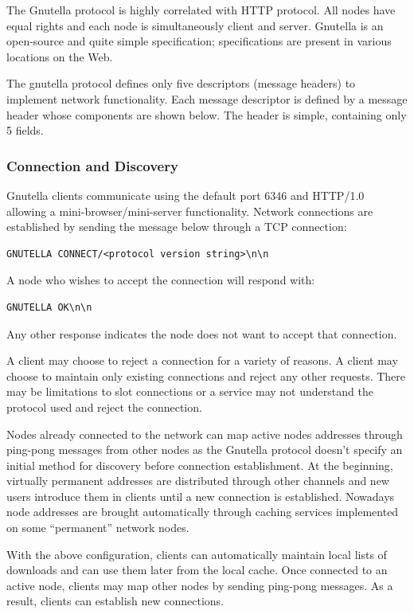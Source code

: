 The Gnutella protocol is highly correlated with HTTP protocol. All nodes have
equal rights and each node is simultaneously client and server. Gnutella is an
open-source and quite simple specification; specifications are present in
various locations on the Web.

The gnutella protocol defines only five descriptors (message headers) to
implement network functionality. Each message descriptor is defined by a
message header whose components are shown below. The header is simple,
containing only 5 fields.

\subsubsection{Connection and Discovery}

Gnutella clients communicate using the default port 6346 and HTTP/1.0 allowing
a mini-browser/mini-server functionality. Network connections are established
by sending the message below through a TCP connection:

\begin{verbatim}
GNUTELLA CONNECT/<protocol version string>\n\n
\end{verbatim}

A node who wishes to accept the connection will respond with:
\begin{verbatim}
GNUTELLA OK\n\n
\end{verbatim}

Any other response indicates the node does not want to accept that connection.

A client may choose to reject a connection for a variety of reasons. A client
may choose to maintain only existing connections and reject any other
requests. There may be limitations to slot connections or a service may not
understand the protocol used and reject the connection.

Nodes already connected to the network can map active nodes addresses through
ping-pong messages from other nodes as the Gnutella protocol doesn't specify
an initial method for discovery before connection establishment. At the
beginning, virtually permanent addresses are distributed through other channels
and new users introduce them in clients until a new connection is established.
Nowadays node addresses are brought automatically through caching services
implemented on some ``permanent'' network nodes.

With the above configuration, clients can automatically maintain local lists
of downloads and can use them later from the local cache. Once connected to an
active node, clients may map other nodes by sending ping-pong messages. As a
result, clients can establish new connections.

